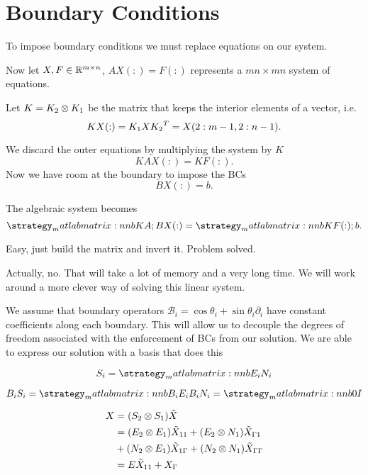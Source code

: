 \section{Boundary Conditions}
\begin{frame}{To impose boundary conditions we must replace equations on our system.}

Now let $X,F\in\mathbb{R}^{m\times n}$, $AX(:)=F(:)$ represents a $mn\times mn$ system of equations.

Let $K=K_2\otimes K_1$ be the matrix that keeps the interior elements of a vector, i.e.
\begin{equation*}
KX(:)=K_1 X {K_2}^{T}=X(2:m-1,2:n-1).
\end{equation*}	

We discard the outer equations by multiplying the system by $K$ 
\begin{equation*}
KAX(:)=KF(:).
\end{equation*}
Now  we have room at the boundary to impose the BCs
\begin{equation*}
BX(:)=b.
\end{equation*}

\end{frame}

\begin{frame}{The algebraic system becomes}
\begin{equation*}
\matlabmatrix{KA; B}X(:)=\matlabmatrix{KF(:); b}.
\end{equation*}

\bigskip
Easy, just build the matrix and invert it. Problem solved.

\bigskip
Actually, no. That will take a lot of memory and a very long time. We will work around a more clever way of solving this linear system.
\end{frame}


\begin{frame}
We assume that boundary operators $\mathcal{B}_i=\cos{\theta_i}+\sin{\theta_i} \partial_i$ have constant coefficients along each boundary. This will allow us to decouple the degrees of freedom associated with the enforcement of BCs from our solution. We are able to express our solution with a basis that does this

\begin{equation*}
S_i=\matlabmatrix{E_i N_i}
\end{equation*}

\begin{equation*}
B_iS_i=\matlabmatrix{B_iE_i B_iN_i}=\matlabmatrix{0 I}
\end{equation*}

\begin{align*}
X&=(S_2\otimes S_1) \tilde{X} \\
&=(E_2\otimes E_1)\tilde{X}_{11}
+(E_2\otimes N_1)\tilde{X}_{\Gamma 1}\\
&+(N_2\otimes E_1)\tilde{X}_{1\Gamma}
+(N_2\otimes N_1)\tilde{X}_{\Gamma \Gamma}\\
&=E \tilde{X}_{11} + X_\Gamma
\end{align*}

\end{frame}


